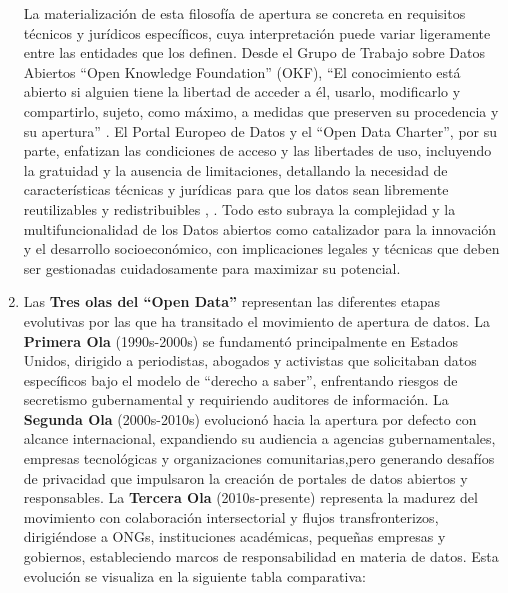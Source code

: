 \begin{enumerate}
	La materialización de esta filosofía de apertura se concreta en requisitos técnicos y jurídicos específicos, cuya interpretación puede variar ligeramente entre las entidades que los definen. Desde el Grupo de Trabajo sobre Datos Abiertos ``Open Knowledge Foundation'' (OKF), “El conocimiento está abierto si alguien tiene la libertad de acceder a él, usarlo, modificarlo y compartirlo, sujeto, como máximo, a medidas que preserven su procedencia y su apertura” \citep{OpenKnowledgeFoundation}. El Portal Europeo de Datos y el ``Open Data Charter'', por su parte, enfatizan las condiciones de acceso y las libertades de uso, incluyendo la gratuidad y la ausencia de limitaciones, detallando la necesidad de características técnicas y jurídicas para que los datos sean libremente reutilizables y redistribuibles \citep{dataEuropaOpenData}, \citep{Open_Data_Charter}.
	Todo esto subraya la complejidad y la multifuncionalidad de los Datos abiertos como catalizador para la innovación y el desarrollo socioeconómico, con implicaciones legales y técnicas que deben ser gestionadas cuidadosamente para maximizar su potencial. \\
	
	\item Las \textbf{Tres olas del ``Open Data'' } \label{def5} representan las diferentes etapas evolutivas por las que ha transitado el movimiento de apertura de datos. 
	La \textbf{Primera Ola} (1990s-2000s) se fundamentó principalmente en Estados Unidos, dirigido a periodistas, abogados y activistas que solicitaban datos específicos bajo el modelo de ``derecho a saber'', enfrentando riesgos de secretismo gubernamental y requiriendo auditores de información. 
	La \textbf{Segunda Ola} (2000s-2010s) evolucionó hacia la apertura por defecto con alcance internacional, expandiendo su audiencia a agencias gubernamentales, empresas tecnológicas y organizaciones comunitarias,pero generando desafíos de privacidad que impulsaron la creación de portales de datos abiertos y responsables.
	La \textbf{Tercera Ola} (2010s-presente) representa la madurez del movimiento  con colaboración intersectorial y flujos transfronterizos, dirigiéndose a ONGs, instituciones académicas, pequeñas empresas y gobiernos, estableciendo marcos de responsabilidad en materia de datos. 
	Esta evolución se visualiza en la siguiente tabla comparativa:
	

\end{enumerate}
